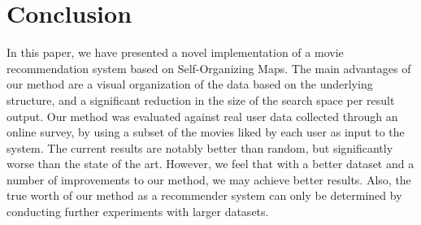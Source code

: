 \documentclass[conference]{IEEEtran}
\begin{document}
%





\section{Conclusion}
In this paper, we have presented a novel implementation of a movie recommendation system based on Self-Organizing Maps. The main advantages of our method are a visual organization of the data based on the underlying structure, and a significant reduction in the size of the search space per result output. Our method was evaluated against real user data collected through an online survey, by using a subset of the movies liked by each user as input to the system. The current results are notably better than random, but significantly worse than the state of the art. However, we feel that with a better dataset and a number of improvements to our method, we may achieve better results. Also, the true worth of our method as a recommender system can only be determined by conducting further experiments with larger datasets.  
\end{document}
